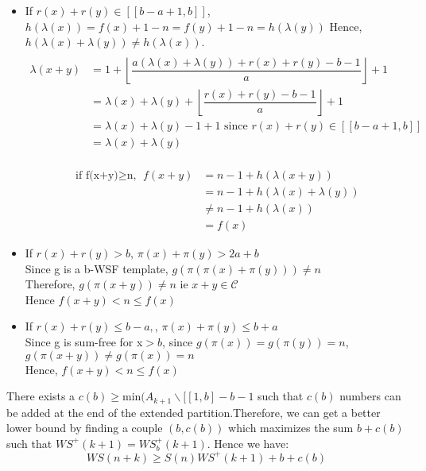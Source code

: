 \begin{itemize}
\item If \(r(x)+r(y) \in [\![b-a+1,b]\!]\), \(h(\lambda(x))=f(x)+1-n=f(y)+1-n=h(\lambda(y))\)
Hence, \(h(\lambda(x)+\lambda(y)) \neq h(\lambda(x))\).
\begin{align*}
 \\\lambda(x+y) & =1+\left\lfloor\dfrac{a(\lambda(x)+\lambda(y))+r(x)+r(y)-b-1}{a}\right\rfloor+1\\
& = \lambda(x)+\lambda(y)+\left\lfloor\dfrac{r(x)+r(y)-b-1}{a}\right\rfloor+1 \\
& = \lambda(x)+\lambda(y) -1 +1 \text{ since } r(x)+r(y) \in [\![b-a+1,b]\!] \\
& =\lambda(x)+\lambda(y)
\end{align*}


\begin{align*}
 \\\text{if f(x+y)\(\geqslant\)n, }f(x+y) & =n-1+h(\lambda(x+y))\\
& =n-1+h(\lambda(x)+\lambda(y)) \\
& \neq n-1+h(\lambda(x))\\
& =f(x)
\end{align*}


\item If \(r(x)+r(y)>b\), \(\pi(x)+\pi(y)>2a+b\)
\\Since g is a b-WSF template, \(g(\pi(\pi(x)+\pi(y))) \neq n\)
\\Therefore, \(g(\pi(x+y)) \neq n\) ie \(x+y \in \mathcal{C}\)
\\Hence \(f(x+y) <n\leqslant f(x)\)
\item If \(r(x)+r(y)\leqslant b-a,\), \(\pi(x)+\pi(y)\leqslant b+a\)
\\Since g is sum-free for x\(>b\), since \(g(\pi(x)) = g(\pi(y))=n\), \(g(\pi(x+y)) \neq g(\pi(x))=n\)
\\Hence, \(f(x+y) <n\leqslant f(x)\)
\end{itemize}

\begin{remark}
There exists a \(c(b) \geqslant \text{min}(A_{k+1} \backslash [\![1,b] - b - 1\) such that \(c(b)\) numbers can be
added at the end of the extended partition.Therefore, we can get a better lower bound by finding a couple \((b,c(b))\)
which maximizes the sum \(b+c(b)\) such that \(WS^+(k+1)=WS_b^+(k+1)\). Hence we have:
	\[ WS(n+k) \geqslant S(n) WS^+(k+1)+b+c(b)\]

\end{remark}

